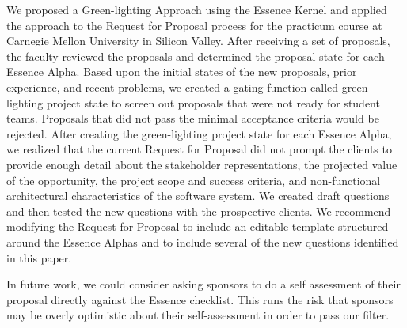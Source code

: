 \documentclass[conference]{IEEEtran}
\begin{document}
We proposed a Green-lighting Approach using the Essence Kernel and
applied the approach to the Request for Proposal process for the
practicum course at Carnegie Mellon University in Silicon Valley. After
receiving a set of proposals, the faculty reviewed the proposals and
determined the proposal state for each Essence Alpha. Based upon the
initial states of the new proposals, prior experience, and recent
problems, we created a gating function called green-lighting project
state to screen out proposals that were not ready for student teams.
Proposals that did not pass the minimal acceptance criteria would be
rejected. After creating the green-lighting project state for each
Essence Alpha, we realized that the current Request for Proposal did
not prompt the clients to provide enough detail about the stakeholder
representations, the projected value of the opportunity, the project
scope and success criteria, and non-functional architectural
characteristics of the software system. We created draft 
questions and then tested the new questions with the prospective
clients. We recommend modifying the Request for Proposal to include
an editable template structured around the Essence Alphas and to include
several of the new questions identified in this paper.

In future work, we could consider asking sponsors to do a self
assessment of their proposal directly against the Essence checklist. 
This runs the risk that sponsors may be overly optimistic about 
their self-assessment in order to pass our filter.


%
%
\end{document}
